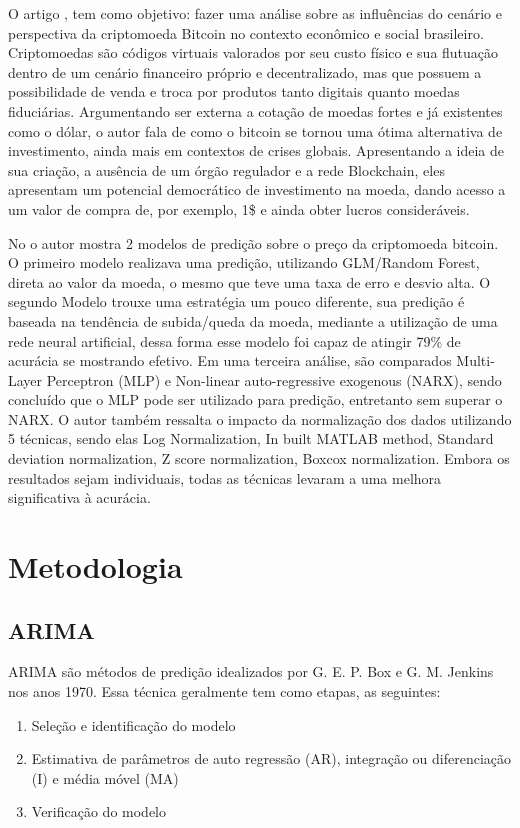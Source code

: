 \documentclass[sigplan,screen]{acmart}
\begin{document}
O artigo \cite{dos2021cenario}, tem como objetivo: fazer uma análise sobre as influências do cenário e perspectiva da criptomoeda Bitcoin no contexto econômico e social brasileiro.
Criptomoedas são códigos virtuais valorados por seu custo físico e sua flutuação dentro de um cenário financeiro próprio e decentralizado, mas que possuem a possibilidade de venda e troca por produtos tanto digitais quanto moedas fiduciárias.
Argumentando ser externa a cotação de moedas fortes e já existentes como o dólar, o autor fala de como o bitcoin se tornou uma ótima alternativa de investimento, ainda mais em contextos de crises globais.
Apresentando a ideia de sua criação, a ausência de um órgão regulador e a rede Blockchain, eles apresentam um potencial democrático de investimento na moeda, dando acesso a um valor de compra de, por exemplo, 1\$ e ainda obter lucros consideráveis.

No \cite{8323676} o autor mostra 2 modelos de predição sobre o preço da criptomoeda bitcoin.
O primeiro modelo realizava uma predição, utilizando GLM/Random Forest, direta ao valor da moeda, o mesmo que teve uma taxa de erro e desvio alta.
O segundo Modelo trouxe uma estratégia um pouco diferente, sua predição é baseada na tendência de subida/queda da moeda, mediante a utilização de uma rede neural artificial, dessa forma esse modelo foi capaz de atingir 79\% de acurácia se mostrando efetivo.
Em uma terceira análise, são comparados Multi-Layer Perceptron (MLP) e Non-linear auto-regressive exogenous (NARX), sendo concluído que o MLP pode ser utilizado para predição, entretanto sem superar o NARX.
O autor também ressalta o impacto da normalização dos dados utilizando 5 técnicas, sendo elas Log Normalization, In built MATLAB method, Standard deviation normalization, Z score normalization, Boxcox normalization.
Embora os resultados sejam individuais, todas as técnicas levaram a uma melhora significativa à acurácia.   

\section{Metodologia}
\subsection{ARIMA}
ARIMA são métodos de predição idealizados por G. E. P. Box e G. M. Jenkins nos anos 1970.
Essa técnica geralmente tem como etapas, as seguintes:
\begin{enumerate}
  \item Seleção e identificação do modelo
  \item Estimativa de parâmetros de auto regressão (AR), integração ou diferenciação (I) e média móvel (MA)
  \item Verificação do modelo
\end{enumerate}
\end{document}
